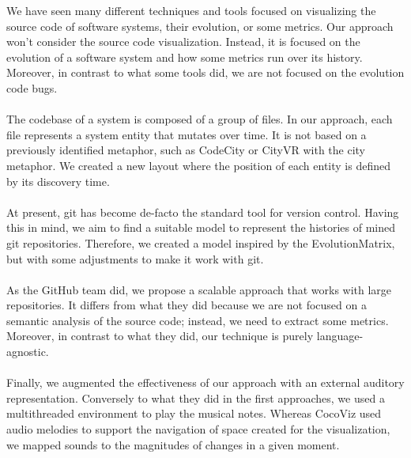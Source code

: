 We have seen many different techniques and tools focused on visualizing the source code of software systems, their evolution, or some metrics.
Our approach won't consider the source code visualization. Instead, it is focused on the evolution of a software system and how some metrics run over its history. 
Moreover, in contrast to what some tools did, we are not focused on the evolution code bugs.\\
\\
The codebase of a system is composed of a group of files. In our approach, each file represents a system entity that mutates over time.
It is not based on a previously identified metaphor, such as CodeCity or CityVR with the city metaphor.
We created a new layout where the position of each entity is defined by its discovery time. \\
\\
At present, git has become de-facto the standard tool for version control. 
Having this in mind, we aim to find a suitable model to represent the histories of mined git repositories.
Therefore, we created a model inspired by the EvolutionMatrix, but with some adjustments to make it work with git. \\
\\
As the GitHub team did, we propose a scalable approach that works with large repositories. 
It differs from what they did because we are not focused on a semantic analysis of the source code; instead, we need to extract some metrics. 
Moreover, in contrast to what they did, our technique is purely language-agnostic.\\
\\
Finally, we augmented the effectiveness of our approach with an external auditory representation. 
Conversely to what they did in the first approaches, we used a multithreaded environment to play the musical notes. 
Whereas CocoViz used audio melodies to support the navigation of space created for the visualization, we mapped sounds to the magnitudes of changes in a given moment. 





